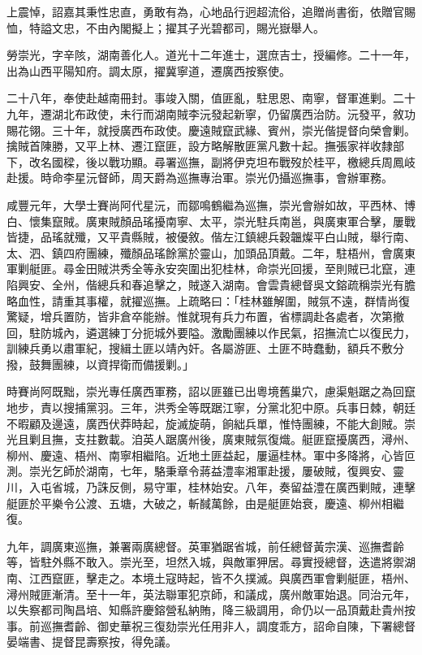 \begin{pinyinscope}
上震悼，詔嘉其秉性忠直，勇敢有為，心地品行迥超流俗，追贈尚書銜，依贈官賜恤，特謚文忠，不由內閣擬上；擢其子光碧都司，賜光嶽舉人。

勞崇光，字辛陔，湖南善化人。道光十二年進士，選庶吉士，授編修。二十一年，出為山西平陽知府。調太原，擢冀寧道，遷廣西按察使。

二十八年，奉使赴越南冊封。事竣入關，值匪亂，駐思恩、南寧，督軍進剿。二十九年，遷湖北布政使，未行而湖南賊李沅發起新寧，仍留廣西治防。沅發平，敘功賜花翎。三十年，就授廣西布政使。慶遠賊竄武緣、賓州，崇光偕提督向榮會剿。擒賊首陳勝，又平上林、遷江竄匪，設方略解散匪黨凡數十起。撫張家祥收隸部下，改名國樑，後以戰功顯。尋署巡撫，副將伊克坦布戰歿於桂平，檄總兵周鳳岐赴援。時命李星沅督師，周天爵為巡撫專治軍。崇光仍攝巡撫事，會辦軍務。

咸豐元年，大學士賽尚阿代星沅，而鄒鳴鶴繼為巡撫，崇光會辦如故，平西林、博白、懷集竄賊。廣東賊顏品瑤擾南寧、太平，崇光駐兵南邕，與廣東軍合擊，屢戰皆捷，品瑤就殲，又平貴縣賊，被優敘。偕左江鎮總兵穀韞燦平白山賊，舉行南、太、泗、鎮四府團練，殲顏品瑤餘黨於靈山，加頭品頂戴。二年，駐梧州，會廣東軍剿艇匪。尋金田賊洪秀全等永安突圍出犯桂林，命崇光回援，至則賊已北竄，連陷興安、全州，偕總兵和春追擊之，賊遂入湖南。會雲貴總督吳文鎔疏稱崇光有膽略血性，請重其事權，就擢巡撫。上疏略曰：「桂林雖解圍，賊氛不遠，群情尚復驚疑，增兵置防，皆非倉卒能辦。惟就現有兵力布置，省標調赴各處者，次第撤回，駐防城內，遴選練丁分扼城外要隘。激勵團練以作民氣，招撫流亡以復民力，訓練兵勇以肅軍紀，搜緝土匪以靖內奸。各屬游匪、土匪不時蠢動，額兵不敷分撥，鼓舞團練，以資捍衛而備援剿。」

時賽尚阿既黜，崇光專任廣西軍務，詔以匪雖已出粵境舊巢穴，慮渠魁踞之為回竄地步，責以搜捕黨羽。三年，洪秀全等既踞江寧，分黨北犯中原。兵事日棘，朝廷不暇顧及邊遠，廣西伏莽時起，旋滅旋萌，餉絀兵單，惟恃團練，不能大創賊。崇光且剿且撫，支拄數載。洎英人踞廣州後，廣東賊氛復熾。艇匪竄擾廣西，潯州、柳州、慶遠、梧州、南寧相繼陷。近地土匪益起，屢逼桂林。軍中多降將，心皆叵測。崇光乞師於湖南，七年，駱秉章令蔣益澧率湘軍赴援，屢破賊，復興安、靈川，入屯省城，乃誅反側，易守軍，桂林始安。八年，奏留益澧在廣西剿賊，連擊艇匪於平樂令公渡、五塘，大破之，斬馘萬餘，由是艇匪始衰，慶遠、柳州相繼復。

九年，調廣東巡撫，兼署兩廣總督。英軍猶踞省城，前任總督黃宗漢、巡撫耆齡等，皆駐外縣不敢入。崇光至，坦然入城，與敵軍狎居。尋實授總督，迭遣將禦湖南、江西竄匪，擊走之。本境土寇時起，皆不久撲滅。與廣西軍會剿艇匪，梧州、潯州賊匪漸清。至十一年，英法聯軍犯京師，和議成，廣州敵軍始退。同治元年，以失察都司陶昌培、知縣許慶鎔營私納賄，降三級調用，命仍以一品頂戴赴貴州按事。前巡撫耆齡、御史華祝三復劾崇光任用非人，調度乖方，詔命自陳，下署總督晏端書、提督昆壽察按，得免議。


\end{pinyinscope}
